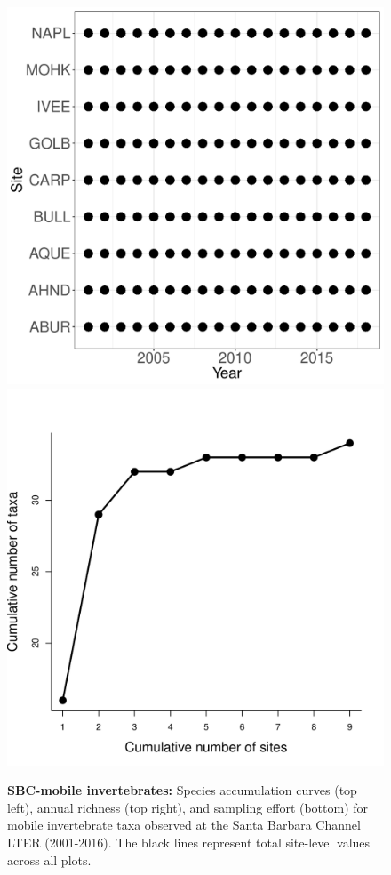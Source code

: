 \documentclass[11pt, oneside]{article}
\begin{document}
\begin{figure}[h!]
\includegraphics[scale = 0.4]{sbc-mobileInverts-castorani_spatiotemporal_sampling_effort.pdf}
\includegraphics[scale = 0.4]{sbc-mobileInverts-castorani_species_accumulation_space.pdf}
\caption{{\bf SBC-mobile invertebrates:} Species accumulation curves (top left),  annual richness (top right), and sampling effort (bottom)  for mobile invertebrate taxa observed at  the Santa Barbara Channel LTER (2001-2016). The black lines represent total site-level values across all plots.}
\label{sbc-mobileInverts}
\end{figure}
\end{document}
